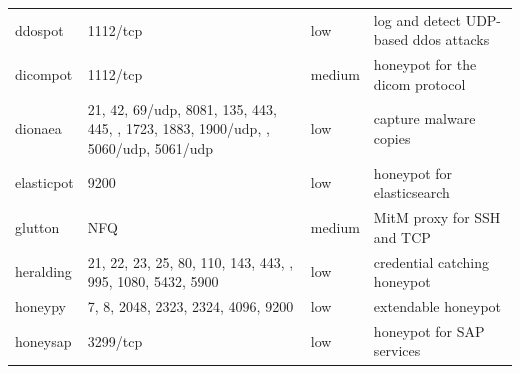 \begin{table}
{\begin{tabularx}{\linewidth}{l|XlX}
        ddospot \cite{ddosspot2021}              & 1112/tcp                                                                                                    & low                        & log and detect UDP-based \ac{ddos} attacks                                           \\
        dicompot \cite{dicompot2021}             & 1112/tcp                                                                                                    & medium                     & honeypot for the \ac{dicom} protocol                                                 \\
        dionaea \cite{dionaea2021}               & 21, 42, 69/udp, 8081, 135, 443, 445, \newline 1433, 1723, 1883, 1900/udp, \newline 3306, 5060/udp, 5061/udp & low                        & capture malware copies                                                               \\
        elasticpot \cite{elasticpot2021}         & 9200                                                                                                        & low                        & honeypot for elasticsearch                                                           \\
        glutton \cite{glutton2021}               & NFQ                                                                                                         & medium                     & MitM proxy for SSH and TCP                                                           \\
        heralding \cite{heralding2021}           & 21, 22, 23, 25, 80, 110, 143, 443, \newline 993, 995, 1080, 5432, 5900                                      & low                        & credential catching honeypot                                                         \\
        honeypy \cite{honeysap2021}              & 7, 8, 2048, 2323, 2324, 4096, 9200                                                                          & low                        & extendable honeypot                                                                  \\
        honeysap \cite{honeysap2021}             & 3299/tcp                                                                                                    & low                        & honeypot for SAP services                                                            \\

\end{tabularx}}
\end{table}
